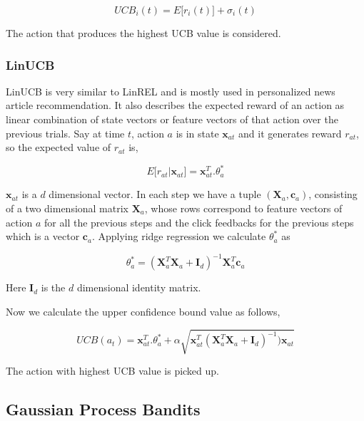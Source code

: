 \documentclass[english]{tktltiki}
\begin{document}
\begin{equation}
UCB_i(t) = E\big[r_i(t)\big] + \sigma_i(t)
\end{equation}

The action that produces the highest UCB value is considered.


\subsubsection{LinUCB}

LinUCB \cite{linucb} is very similar to LinREL and is mostly used in personalized news article recommendation. It also describes the expected reward of an action as linear combination of state vectors or feature vectors of that action over the previous trials. Say at time $t$, action $a$ is in state $\mathbf{x}_{at}$ and it generates reward $r_{at}$, so the expected value of $r_{at}$ is,

\begin{equation}
E\big[r_{at}|\mathbf{x}_{at}\big] = \mathbf{x}_{at}^T . \theta_a^*
\end{equation}

$\mathbf{x}_{at}$ is a $d$ dimensional vector. In each step we have a tuple $(\mathbf{X}_a, \mathbf{c}_a)$, consisting of a two dimensional matrix $\mathbf{X}_a$, whose rows correspond to feature vectors of action $a$ for all the previous steps and the click feedbacks for the previous steps which is a vector $\mathbf{c}_a$. Applying ridge regression we calculate $\theta_a^*$ as

\begin{equation}
\theta_a^* = (\mathbf{X}_a^T \mathbf{X}_a + \mathbf{I}_d)^{-1} \mathbf{X}_a^T \mathbf{c}_a
\end{equation}

Here $\mathbf{I}_d$ is the $d$ dimensional identity matrix.

Now we calculate the upper confidence bound value as follows,

\begin{equation}
UCB(a_t) = \mathbf{x}_{at}^T . \theta_a^* + \alpha \sqrt{\mathbf{x}_{at}^T (\mathbf{X}_a^T \mathbf{X}_a + \mathbf{I}_d)^{-1}) \mathbf{x}_{at}}
\end{equation}

The action with highest UCB value is picked up.

\subsection{Gaussian Process Bandits}
\end{document}
